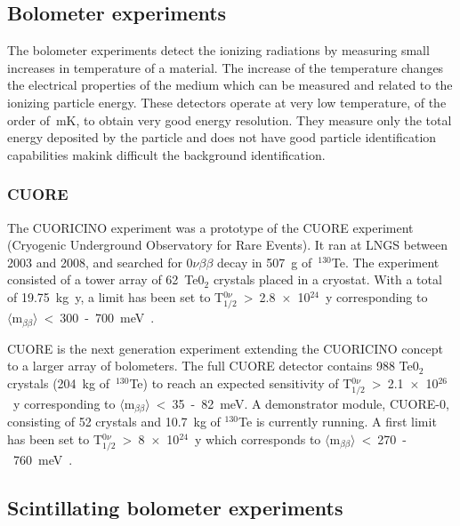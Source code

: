 \documentclass[main.tex]{subfiles}
\begin{document}
\subsection{Bolometer experiments}


\NI The bolometer experiments detect the ionizing radiations by measuring small increases in temperature of a material. The increase of the temperature changes the electrical properties of the medium which can be measured and related to the ionizing particle energy. These detectors operate at very low temperature, of the order of~mK, to obtain very good energy resolution. They measure only the total energy deposited by the particle and does not have good particle identification capabilities makink difficult the background identification.


\subsubsection{CUORE}


\NI The CUORICINO experiment was a prototype of the CUORE experiment (Cryogenic Underground Observatory for Rare Events). It ran at LNGS between 2003 and 2008, and searched for 0$\nu\beta\beta$ decay in 507~g of~$^{\text{130}}$Te.  The experiment consisted of a tower array of 62~Te0$_\text{2}$ crystals placed in a cryostat. With a total of 19.75~kg~y, a limit has been set to T$_{\text{1/2}}^{0\nu}$~>~2.8~$\times$~10$^{\text{24}}$~y corresponding to $\langle \text{m}_{\beta\beta} \rangle$~<~300~-~700~meV~\cite{CUORICINO}.


\bigskip


\NI CUORE is the next generation experiment extending the CUORICINO concept to a larger array of bolometers. The full CUORE detector contains 988 Te0$_\text{2}$ crystals (204~kg of~$^{\text{130}}$Te) to reach an expected sensitivity of T$_{\text{1/2}}^{0\nu}$~>~2.1~$\times$~10$^{\text{26}}$~y corresponding to $\langle \text{m}_{\beta\beta} \rangle$~<~35~-~82~meV. A demonstrator module, CUORE-0, consisting of 52 crystals and 10.7~kg of $^{\text{130}}$Te is currently running. A first limit has been set to T$_{\text{1/2}}^{0\nu}$~>~8~$\times$~10$^{\text{24}}$~y which corresponds to $\langle \text{m}_{\beta\beta} \rangle$~<~270~-~760~meV~\cite{CUORE}.


\subsection{Scintillating bolometer experiments}
\end{document}
